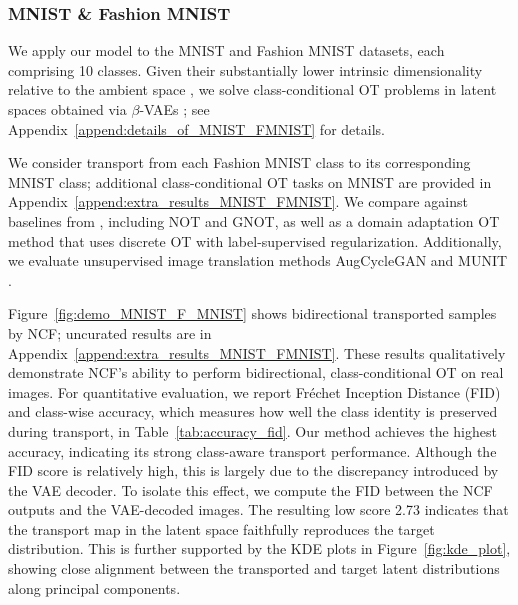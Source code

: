 \documentclass{article} %
\theoremstyle{plain}
\theoremstyle{definition}
\theoremstyle{remark}
\begin{document}
\vspace{-0.1cm}

\subsubsection{MNIST \& Fashion MNIST}\label{subsection:MNIST_FMNIST}\vspace{-0.5em}

We apply our model to the MNIST \citep{lecun1998mnist} and Fashion MNIST \citep{xiao2017fashion} datasets, each comprising 10 classes. Given their substantially lower intrinsic dimensionality relative to the ambient space \citep{pope2021intrinsic}, we solve class-conditional OT problems in latent spaces obtained via $\beta$-VAEs \citep{higgins2017beta}; see Appendix~\ref{append:details_of_MNIST_FMNIST} for details. 

{We consider transport from each Fashion MNIST class to its corresponding MNIST class; additional class-conditional OT tasks on MNIST are provided in Appendix~\ref{append:extra_results_MNIST_FMNIST}.
We compare against baselines from \citet{asadulaev2022neural}, including NOT and GNOT, as well as a domain adaptation OT method \citep{courty2016optimal, flamary2021pot} that uses discrete OT with label-supervised regularization. Additionally, we evaluate unsupervised image translation methods AugCycleGAN \citep{almahairi2018augmented} and MUNIT \citep{huang2018multimodal}. }


{Figure~\ref{fig:demo_MNIST_F_MNIST} shows bidirectional transported samples by NCF; uncurated results are in Appendix~\ref{append:extra_results_MNIST_FMNIST}. 
These results qualitatively demonstrate NCF’s ability to perform bidirectional, class-conditional OT on real images.
For quantitative evaluation, we report Fréchet Inception Distance (FID) \citep{heusel2017gans} and class-wise accuracy, which measures how well the class identity is preserved during transport, in Table~\ref{tab:accuracy_fid}. Our method achieves the highest accuracy, indicating its strong class-aware transport performance. Although the FID score is relatively high, this is largely due to the discrepancy introduced by the VAE decoder. To isolate this effect, we compute the FID between the NCF outputs and the VAE-decoded images. The resulting low score 2.73 indicates that the transport map in the latent space faithfully reproduces the target distribution. This is further supported by the KDE plots in Figure~\ref{fig:kde_plot}, showing close alignment between the transported and target latent distributions along principal components.}
\end{document}
